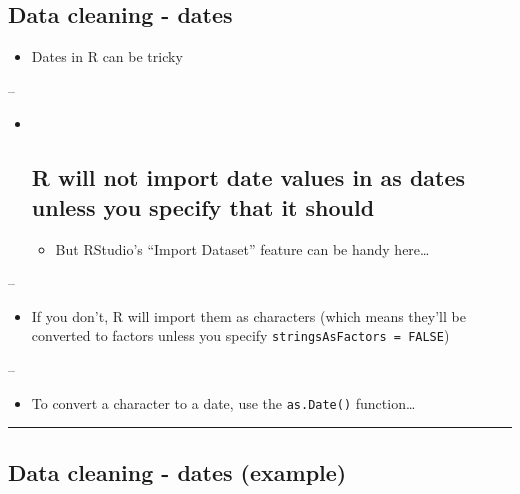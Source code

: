 \documentclass[]{article}
\providecommand{\tightlist}{%
  \setlength{\itemsep}{0pt}\setlength{\parskip}{0pt}}
\begin{document}
\hypertarget{data-cleaning---dates}{%
\subsection{Data cleaning - dates}\label{data-cleaning---dates}}

\begin{itemize}
\tightlist
\item
  Dates in R can be tricky
\end{itemize}

--

\begin{itemize}
\item ~
  \hypertarget{r-will-not-import-date-values-in-as-dates-unless-you-specify-that-it-should}{%
  \subsection{R will not import date values in as dates unless you
  specify that it
  should}\label{r-will-not-import-date-values-in-as-dates-unless-you-specify-that-it-should}}

  \begin{itemize}
  \tightlist
  \item
    But RStudio's ``Import Dataset'' feature can be handy here\ldots{}
  \end{itemize}
\end{itemize}

--

\begin{itemize}
\tightlist
\item
  If you don't, R will import them as characters (which means they'll be
  converted to factors unless you specify
  \texttt{stringsAsFactors\ =\ FALSE})
\end{itemize}

--

\begin{itemize}
\tightlist
\item
  To convert a character to a date, use the \texttt{as.Date()}
  function\ldots{}
\end{itemize}

\begin{center}\rule{0.5\linewidth}{\linethickness}\end{center}

\hypertarget{data-cleaning---dates-example}{%
\subsection{Data cleaning - dates
(example)}\label{data-cleaning---dates-example}}
\end{document}
